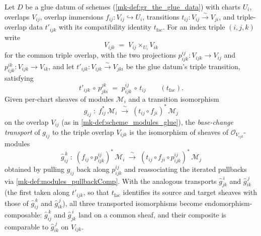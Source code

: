 \begin{lemma}\label{mk-lem:modules_pullback_basechange_transport}
  \leanok

  Let \(D\) be a glue datum of schemes (\ref{mk-def:gr_the_glue_data}) with charts
  \(U_i\), overlaps \(V_{ij}\), overlap immersions \(f_{ij} : V_{ij} \hookrightarrow
  U_i\), transitions \(t_{ij} : V_{ij} \xrightarrow{\sim} V_{ji}\), and triple-overlap
  data \(t'_{ijk}\) with its compatibility identity \(t_{\mathrm{fac}}\). For an index
  triple \((i,j,k)\) write
  \[
    V_{ijk} \;=\; V_{ij} \times_{U_i} V_{ik}
  \]
  for the common triple overlap, with the two projections
  \(p^{ij}_{ijk} : V_{ijk} \to V_{ij}\) and \(p^{ik}_{ijk} : V_{ijk} \to V_{ik}\), and
  let \(t'_{ijk} : V_{ijk} \xrightarrow{\sim} V_{jki}\) be the glue datum's triple
  transition, satisfying
  \[
    t'_{ijk} \,\circ\, p^{jk}_{jki} \;=\; p^{ij}_{ijk} \,\circ\, t_{ij}
    \qquad (t_{\mathrm{fac}}).
  \]
  Given per-chart sheaves of modules \(\mathcal{M}_i\) and a transition isomorphism
  \[
    g_{ij} \;:\; f_{ij}^{*}\,\mathcal{M}_i
      \;\xrightarrow{\ \sim\ }\;
    (t_{ij} \circ f_{ji})^{*}\,\mathcal{M}_j
  \]
  on the overlap \(V_{ij}\) (as in \ref{mk-def:scheme_modules_glue}), the
  \emph{base-change transport} of \(g_{ij}\) to the triple overlap \(V_{ijk}\) is the
  isomorphism of sheaves of \(\mathcal{O}_{V_{ijk}}\)-modules
  \[
    \widehat{g}_{ij}^{\,k}
      \;:\;
    (f_{ij} \circ p^{ij}_{ijk})^{*}\,\mathcal{M}_i
      \;\xrightarrow{\ \sim\ }\;
    (t_{ij} \circ f_{ji} \circ p^{ij}_{ijk})^{*}\,\mathcal{M}_j
  \]
  obtained by pulling \(g_{ij}\) back along \(p^{ij}_{ijk}\) and reassociating the
  iterated pullbacks via \ref{mk-def:modules_pullbackComp}. With the analogous transports
  \(\widehat{g}_{jk}^{\,i}\) and \(\widehat{g}_{ik}^{\,j}\) (the first taken along
  \(t'_{ijk}\), so that \(t_{\mathrm{fac}}\) identifies its source and target sheaves
  with those of \(\widehat{g}_{ij}^{\,k}\) and \(\widehat{g}_{ik}^{\,j}\)), all three
  transported isomorphisms become endomorphism-composable: \(\widehat{g}_{ij}^{\,k}\)
  and \(\widehat{g}_{jk}^{\,i}\) land on a common sheaf, and their composite is
  comparable to \(\widehat{g}_{ik}^{\,j}\) on \(V_{ijk}\).
\end{lemma}

